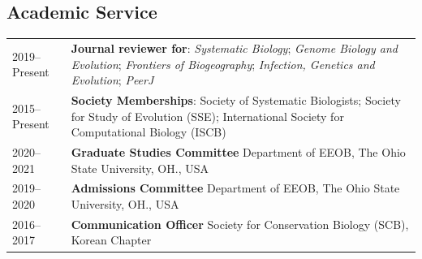 \documentclass[11pt]{article}
\begin{document}
\subsection*{Academic Service}
\begin{longtable}{p{}  p{}}
2019--Present &	\textbf{Journal reviewer for}: \textit{Systematic Biology}; \textit{Genome Biology and Evolution}; \textit{Frontiers of Biogeography}; \textit{Infection, Genetics and Evolution}; \textit{PeerJ}\\
2015--Present &  \textbf{Society Memberships}: Society of Systematic Biologists; Society for Study of Evolution (SSE); International Society for Computational Biology (ISCB)\\

2020--2021 &  \textbf{Graduate Studies Committee} Department of EEOB, The Ohio State University, OH., USA\\
2019--2020 &	\textbf{Admissions Committee} Department of EEOB, The Ohio State University, OH., USA\\
2016--2017 &	\textbf{Communication Officer} Society for Conservation Biology (SCB), Korean Chapter\vspace{5pt}\\
\end{longtable}
\end{document}
